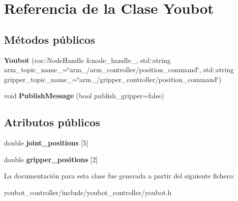 \hypertarget{classYoubot}{\section{\-Referencia de la \-Clase \-Youbot}
\label{classYoubot}
}
\subsection*{\-Métodos públicos}
\begin{DoxyCompactItemize}
\item 
\hypertarget{classYoubot_a0ef7c0403ccf273d6f51d7cb887b2f7c}{{\bfseries \-Youbot} (ros\-::\-Node\-Handle \&node\-\_\-handle\-\_\-, std\-::string arm\-\_\-topic\-\_\-name\-\_\-=\char`\"{}arm\-\_/arm\-\_\-controller/position\-\_\-command\char`\"{}, std\-::string gripper\-\_\-topic\-\_\-name\-\_\-=\char`\"{}arm\-\_/gripper\-\_\-controller/position\-\_\-command\char`\"{})}\label{classYoubot_a0ef7c0403ccf273d6f51d7cb887b2f7c}

\item 
\hypertarget{classYoubot_aa23a2acc7906954316b8f52045bb44e2}{void {\bfseries \-Publish\-Message} (bool publish\-\_\-gripper=false)}\label{classYoubot_aa23a2acc7906954316b8f52045bb44e2}

\end{DoxyCompactItemize}
\subsection*{\-Atributos públicos}
\begin{DoxyCompactItemize}
\item 
\hypertarget{classYoubot_adc7e282fae9020b40f99b953bbf46595}{double {\bfseries joint\-\_\-positions} \mbox{[}5\mbox{]}}\label{classYoubot_adc7e282fae9020b40f99b953bbf46595}

\item 
\hypertarget{classYoubot_aee1421a4ea216200d7ca405d5e0b4b66}{double {\bfseries gripper\-\_\-positions} \mbox{[}2\mbox{]}}\label{classYoubot_aee1421a4ea216200d7ca405d5e0b4b66}

\end{DoxyCompactItemize}


\-La documentación para esta clase fue generada a partir del siguiente fichero\-:\begin{DoxyCompactItemize}
\item 
youbot\-\_\-controller/include/youbot\-\_\-controller/youbot.\-h\end{DoxyCompactItemize}
